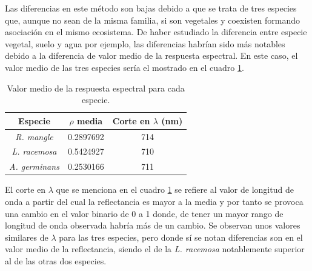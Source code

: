 Las diferencias en este método son bajas debido a que se trata de tres especies que, aunque no sean de la misma familia, si son vegetales y coexisten formando asociación en el mismo ecosistema. De haber estudiado la diferencia entre especie vegetal, suelo y agua por ejemplo, las diferencias habrían sido más notables debido a la diferencia de valor medio de la respuesta espectral. En este caso, el valor medio de las tres especies sería el mostrado en el cuadro \ref{tab:mediaIAE}.\Sep

\begin{table}
	\centering
	\caption[Valores medios de la respuesta espectral]{Valor medio de la respuesta espectral para cada especie.}
	\begin{tabular}{@{}ccc@{}}
	\toprule[0.4mm]
	Especie & $\rho$ media & Corte en $\lambda$ (nm)\\
	\midrule
	\textit{R. mangle} & 0.2897692 & 714	\\
	\textit{L. racemosa} & 0.5424927 & 710\\
	\textit{A. germinans} & 0.2530166 & 711\\
	\bottomrule
	\end{tabular}
	\label{tab:mediaIAE}
\end{table}

El corte en $\lambda$ que se menciona en el cuadro \ref{tab:mediaIAE} se refiere al valor de longitud de onda a partir del cual la reflectancia es mayor a la media y por tanto se provoca una cambio en el valor binario de 0 a 1 donde, de tener un mayor rango de longitud de onda observada habría más de un cambio. Se observan unos valores similares de $\lambda$ para las tres especies, pero donde sí se notan diferencias son en el valor medio de la reflectancia, siendo el de la \textit{L. racemosa} notablemente superior al de las otras dos especies.

